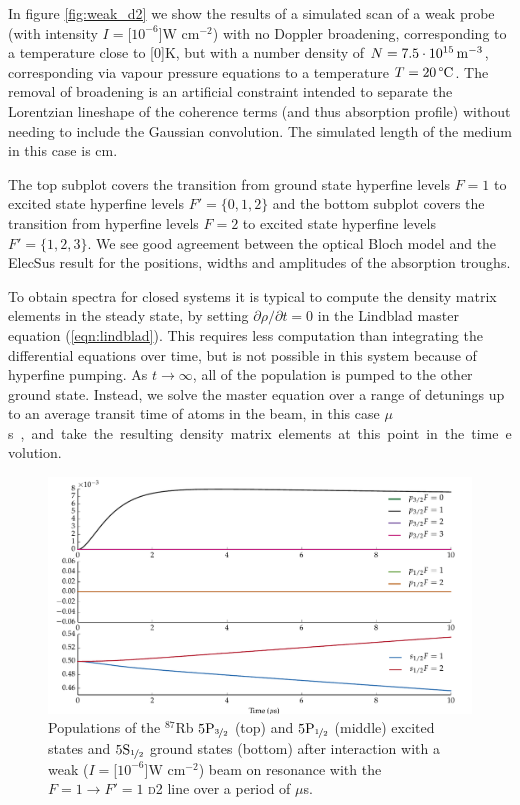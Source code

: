     In figure \ref{fig:weak_d2} we show the results of a simulated scan of a
    weak probe (with intensity $I = $\unit[$10^{-6}$]{W cm$^{-2}$}) with no
    Doppler broadening, corresponding to a temperature close to \unit[$0$]{K},
    but with a number density of $N = \unit[7.5\cdot10^{15}]{m^{-3}}$,
    corresponding via  vapour pressure equations\cite{Zentile2015} to a
    temperature $T = \unit[20]{\text{\textdegree C}}$. The removal of broadening
    is an artificial constraint intended to separate the Lorentzian lineshape of
    the coherence terms (and thus absorption profile) without needing to include
    the Gaussian convolution. The simulated length of the medium in this case is
    \unit[1]{cm}.

    The top subplot covers the transition from ground state hyperfine levels $F
    = 1$ to excited state hyperfine levels $F' = \{ 0, 1, 2 \}$ and the bottom
    subplot covers the transition from hyperfine levels $F = 2$ to excited state
    hyperfine levels $F' = \{ 1, 2, 3 \}$. We see good agreement between the
    optical Bloch model and the ElecSus result for the positions, widths and
    amplitudes of the absorption troughs.

    To obtain spectra for closed systems it is typical to compute the density
    matrix elements in the steady state, \ie by setting  $\partial \rho /
    \partial t = 0$ in the Lindblad master equation (\ref{eqn:lindblad}). This
    requires less computation than integrating the differential equations over
    time, but is not possible in this system because of hyperfine pumping. As $t
    \rightarrow \infty$, all of the population is pumped to the other ground
    state. Instead, we solve the master equation over a range of detunings up to
    an average transit time of atoms in the beam, in this case \unit[2]{$\mu$s},
    and take the resulting density matrix elements at this point in the time
    evolution.

    \begin{figure}[]
    \includegraphics[width=\linewidth]
        {figs/05_twophoton/rb87_5spd_hf_solve_b0_fig1.pdf}
    \caption{
    Populations of the $^{87}$Rb $5\rm{P}_{\nicefrac{3}{2}}$ (top) and
    $5\rm{P}_{\nicefrac{1}{2}}$ (middle) excited states and
    $5\rm{S}_{\nicefrac{1}{2}}$ ground states (bottom)  after interaction with
    a weak ($I = $\unit[$10^{-6}$]{W cm$^{-2}$}) beam on resonance with the $F =
    1 \rightarrow F' = 1$ \textsc{d2} line over a period of \unit[10]{$\mu$s}.
    }
    \label{fig:weak_d2_f11} 
    \end{figure}

